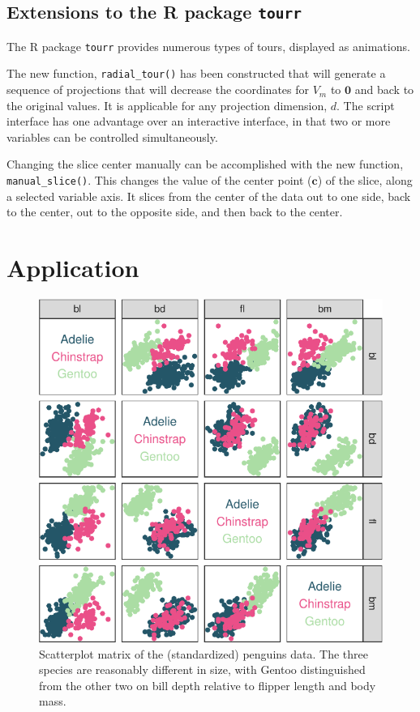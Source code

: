 \documentclass[]{interact}
\theoremstyle{plain}%
\theoremstyle{definition}
\theoremstyle{remark}
\begin{document}
\hypertarget{extensions-to-the-r-package-tourr}{%
\subsection{\texorpdfstring{Extensions to the R package
\texttt{tourr}}{Extensions to the R package tourr}}\label{extensions-to-the-r-package-tourr}}

The R package \texttt{tourr} provides numerous types of tours, displayed
as animations.

The new function, \texttt{radial\_tour()} has been constructed that will
generate a sequence of projections that will decrease the coordinates
for \(V_m\) to \(\boldsymbol{0}\) and back to the original values. It is
applicable for any projection dimension, \(d\). The script interface has
one advantage over an interactive interface, in that two or more
variables can be controlled simultaneously.

Changing the slice center manually can be accomplished with the new
function, \texttt{manual\_slice()}. This changes the value of the center
point (\(\mathbf{c}\)) of the slice, along a selected variable axis. It
slices from the center of the data out to one side, back to the center,
out to the opposite side, and then back to the center.

\hypertarget{sec:examples}{%
\section{Application}\label{sec:examples}}

\begin{figure}

{\centering \includegraphics[width=0.6\linewidth]{paper_files/figure-latex/penguins-scatmat-1} 

}

\caption{Scatterplot matrix of the (standardized) penguins data. The three species are reasonably different in size, with Gentoo distinguished from the other two on bill depth relative to flipper length and body mass.}\label{fig:penguins-scatmat}
\end{figure}
\end{document}
